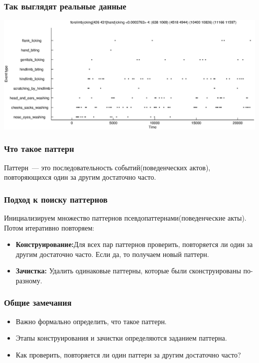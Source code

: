 \documentclass[smaller]{beamer}
\begin{document}
\begin{frame}	
  \frametitle{Так выглядят реальные данные}
    \includegraphics[scale=0.4]{TS.eps} 
\end{frame}


\begin{frame}	
  \frametitle{Что такое паттерн}
Паттерн~--- это последовательность событий(поведенческих актов), повторяющихся один за другим 
достаточно часто.
\end{frame}

\begin{frame}	
  \frametitle{Подход к поиску паттернов}
  Инициализируем множество паттернов псевдопаттернами(поведенческие акты). Потом итеративно повторяем:
  \begin{itemize}
   \item {\bf Конструирование:}Для всех пар паттернов проверить, повторяется ли один за другим достаточно часто. Если да, 
	то получаем новый паттерн. 
   \item {\bf Зачистка:} Удалить одинаковые паттерны, которые были сконструированы по-разному.
  \end{itemize}
\end{frame}

\begin{frame}	
  \frametitle{Общие замечания}
  \begin{itemize}
   \item Важно формально определить, что такое паттерн.
   \item Этапы конструирования и зачистки определяются заданием паттерна.
   \item Как проверить, повторяется ли один паттерн за другим достаточно часто?
  \end{itemize}
\end{frame}
\end{document}
